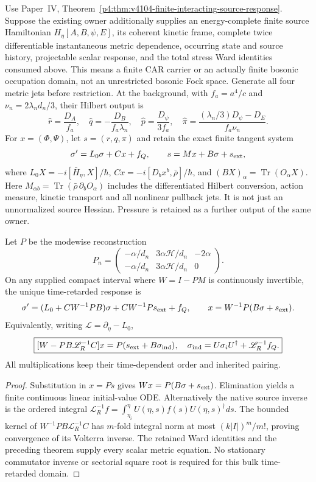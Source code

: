 \documentclass[12pt,a4paper]{article}
\begin{document}
\begin{theorem}
\label{p8:thm:v2147-finite-full-metric-source-schur}
Use Paper~IV, Theorem~\ref{p4:thm:v4104-finite-interacting-source-response}.
Suppose the existing owner additionally supplies an energy-complete finite
source Hamiltonian $H_\eta[A,B,\psi,E]$, its coherent kinetic frame, complete
twice differentiable instantaneous metric dependence, occurring state and
source history, projectable scalar response, and the total stress Ward
identities consumed above.  This means a finite CAR carrier or an actually
finite bosonic occupation domain, not an unrestricted bosonic Fock space.
Generate all four metric jets before restriction.  At the background, with
$f_a=a^4/c$ and $\nu_n=2\lambda_nd_n/3$, their Hilbert output is
\[
 \widehat r=\frac{D_A}{f_a},\quad
 \widehat q=-\frac{D_B}{f_a\lambda_n},\quad
 \widehat p=\frac{D_\psi}{3f_a},\quad
 \widehat\pi=\frac{(\lambda_n/3)D_\psi-D_E}{f_a\nu_n}.
\]
For $x=(\Phi,\Psi)$, let $s=(r,q,\pi)$ and retain the exact finite tangent
system
\[
 \sigma'=L_0\sigma+Cx+f_Q,\qquad
 s=Mx+B\sigma+s_{\rm ext},
\]
where $L_0X=-i[\bar H_\eta,X]/\hbar$, $Cx=-i[D_bx^b,\bar\rho]/\hbar$,
and $(BX)_\alpha=\operatorname{Tr}(O_\alpha X)$.
Here $M_{\alpha b}=\operatorname{Tr}(\bar\rho\,\partial_bO_\alpha)$ includes
the differentiated Hilbert conversion, action measure, kinetic transport and
all nonlinear pullback jets.  It is not just an unnormalized source Hessian.
Pressure is retained as a further output of the same owner.

Let $P$ be the modewise reconstruction
\[
 P_n=\begin{pmatrix}
 -\alpha/d_n&3\alpha\mathcal H/d_n&-2\alpha\\
 -\alpha/d_n&3\alpha\mathcal H/d_n&0
 \end{pmatrix}.
\]
On any supplied compact interval where $W=I-PM$ is continuously invertible,
the unique time-retarded response is
\[
 \sigma'=(L_0+CW^{-1}PB)\sigma+CW^{-1}Ps_{\rm ext}+f_Q,
 \qquad x=W^{-1}P(B\sigma+s_{\rm ext}).
\]
Equivalently, writing $\mathscr L=\partial_\eta-L_0$,
\[
 \boxed{[W-PB\mathscr L_R^{-1}C]x
 =P(s_{\rm ext}+B\sigma_{\rm ind}),\quad
 \sigma_{\rm ind}=U\sigma_iU^\dagger+\mathscr L_R^{-1}f_Q.}
\]
All multiplications keep their time-dependent order and inherited pairing.
\end{theorem}
\begin{proof}
Substitution in $x=Ps$ gives $Wx=P(B\sigma+s_{\rm ext})$.
Elimination yields a finite continuous linear initial-value ODE.
Alternatively the native source inverse is the ordered integral
$\mathscr L_R^{-1}f=\int_{\eta_i}^{\eta}U(\eta,s)f(s)U(\eta,s)^\dagger ds$.
The bounded kernel of $W^{-1}PB\mathscr L_R^{-1}C$ has $m$-fold integral
norm at most $(k|I|)^m/m!$, proving convergence of its Volterra inverse.
The retained Ward identities and the preceding theorem supply every scalar
metric equation.  No stationary commutator inverse or sectorial square root
is required for this bulk time-retarded domain.
\end{proof}
\end{document}

